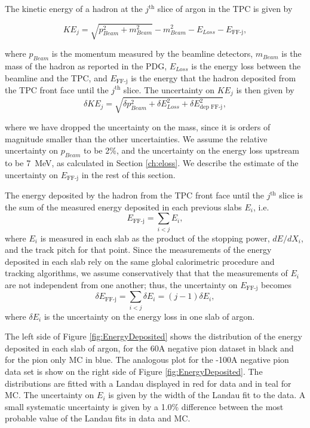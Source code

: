 The kinetic energy of a hadron at the $j^{\text{th}}$ slice of argon in the TPC is given by

\begin{equation}
KE_{j} = \sqrt{p_{Beam}^2 + m_{Beam}^2} - m_{Beam}^2 - E_{Loss} - E_{\text{FF-j}},
\end{equation}

where $p_{Beam}$ is the momentum measured by the beamline detectors,  $m_{Beam}$ is the mass of the hadron as reported in the PDG,  $E_{Loss}$  is the energy loss between the beamline and the TPC, and $ E_{\text{FF-j}}$ is the energy that the hadron deposited from the TPC front face until the $j^{\text{th}}$ slice.
The uncertainty on $KE_{j}$ is then given by 
\begin{equation}
\delta KE_{j} = \sqrt{\delta p_{Beam}^2 + \delta E_{Loss}^2 +  \delta  E_{\text{dep FF-j}}^2},
\end{equation}

where we have dropped the uncertainty on the mass, since it is orders of magnitude smaller than the other uncertainties.
We assume the relative uncertainty on $p_{Beam}$ to be 2\%, and the uncertainty on the energy loss upstream to be 7~MeV, as calculated in Section \ref{ch:eloss}. We describe the estimate of the uncertainty on $E_{\text{FF-j}}$ in the rest of this section.

The energy deposited by the hadron from the TPC front face until the $j^{\text{th}}$ slice is the sum of the measured energy deposited in each previous slabs $E_{i}$, i.e.
\begin{equation}
E_{\text{FF-j}} = \sum_{i<j} E_{i}, 
\end{equation}
where $E_{i}$ is measured in each slab as  the product of the stopping power,  $dE/dX_{i}$,  and the track pitch for that point. Since the measurements of the energy deposited in each slab rely on the same global calorimetric procedure and tracking algorithms, we assume conservatively that that the measurements of $E_{i}$ are not independent from one another; thus, the uncertainty on $E_{\text{FF-j}}$ becomes
\begin{equation}
\delta E_{\text{FF-j}} =  \sum_{i<j}  \delta E_{i} = (j-1) \delta E_{i}, 
\end{equation}
where $\delta E_{i}$ is the uncertainty on the energy loss in one slab of argon.

The left side of Figure \ref{fig:EnergyDeposited} shows the distribution of the energy deposited in each slab of argon, for the 60A negative pion dataset in black and for the pion only MC in blue. The analogous plot for the -100A negative pion data set  is show on the right side of Figure \ref{fig:EnergyDeposited}.  The distributions are fitted with a Landau displayed in red for data and in teal for MC.
The uncertainty on $E_{i}$ is given by the width of the Landau fit to the data. A small systematic uncertainty  is given by a 1.0\% difference between the most probable value of the Landau fits in data and MC.

